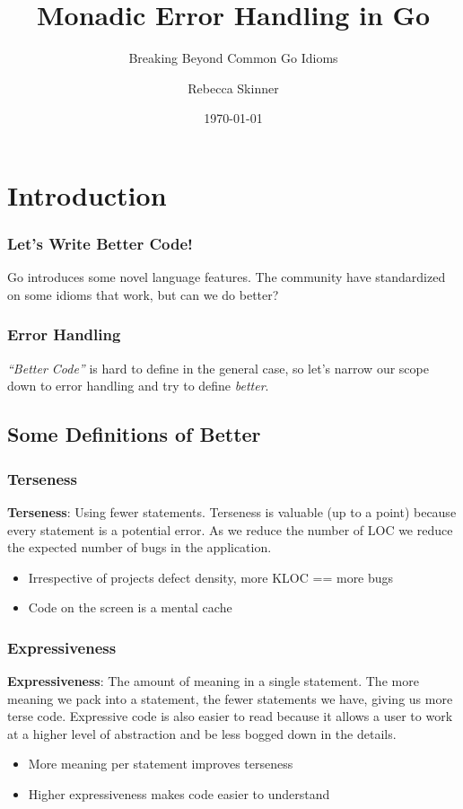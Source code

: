 \documentclass{beamer}
\title{Monadic Error Handling in Go}
\subtitle{Breaking Beyond Common Go Idioms}
\author{Rebecca Skinner}
\institute{Asteris, LLC}
\date{\today}
\begin{document}
\begin{frame}
  \titlepage{}
\end{frame}

\section{Introduction}
\begin{frame}
  \frametitle{Let's Write Better Code!}
  Go introduces some novel language features.  The community have
  standardized on some idioms that work, but can we do better?
\end{frame}

\begin{frame}
  \frametitle{Error Handling}
  {\it ``Better Code''} is hard to define in the general case, so let's
  narrow our scope down to error handling and try to define
  {\it better}.
\end{frame}

\subsection{Some Definitions of Better}
\begin{frame}
  \frametitle{Terseness}
  {\bf Terseness}: Using fewer statements.
  \vfill
  Terseness is valuable (up to a point) because every statement is a
  potential error.  As we reduce the number of LOC we reduce the
  expected number of bugs in the application.
  \vfill
  \begin{itemize}
  \item Irrespective of projects defect density, more KLOC == more bugs
  \item Code on the screen is a mental cache
  \end{itemize}
\end{frame}

\begin{frame}
  \frametitle{Expressiveness}
  {\bf Expressiveness}: The amount of meaning in a single statement.
  \vfill
  The more meaning we pack into a statement, the fewer statements we
  have, giving us more terse code.  Expressive code is also easier to
  read because it allows a user to work at a higher level of
  abstraction and be less bogged down in the details.
  \vfill
  \begin{itemize}
    \item More meaning per statement improves terseness
    \item Higher expressiveness makes code easier to understand
  \end{itemize}
\end{frame}
\end{document}
